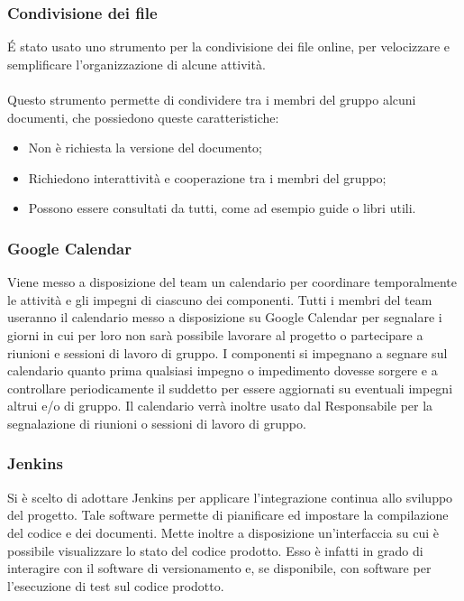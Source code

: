 \subsubsection{Condivisione dei file}
\'E stato usato uno strumento per la condivisione dei file online, per velocizzare e semplificare l'organizzazione di alcune attività.

\paragraph{}
Questo strumento permette di condividere tra i membri del gruppo alcuni documenti, che possiedono queste caratteristiche:
\begin{itemize}
\item Non è richiesta la versione del documento;
\item Richiedono interattività e cooperazione tra i membri del gruppo;
\item Possono essere consultati da tutti, come ad esempio guide o libri utili.
\end{itemize}

\subsubsection{Google Calendar}
\label{4.2}
Viene messo a disposizione del team un calendario per coordinare temporalmente le attività e gli impegni di ciascuno dei componenti.
Tutti i membri del team useranno il calendario messo a disposizione su Google Calendar per segnalare i giorni in cui per loro non sarà possibile lavorare al progetto o partecipare a riunioni e sessioni di lavoro di gruppo. I componenti si impegnano a segnare sul calendario quanto prima qualsiasi impegno o impedimento dovesse sorgere e a controllare periodicamente il suddetto per essere aggiornati su eventuali impegni altrui e/o di gruppo.
Il calendario verrà inoltre usato dal Responsabile per la segnalazione di riunioni o sessioni di lavoro di gruppo.

\subsubsection{Jenkins}
\label{}
Si è scelto di adottare Jenkins per applicare l’integrazione continua allo sviluppo del progetto.
Tale software permette di pianificare ed impostare la compilazione del codice e dei documenti. 
Mette inoltre a disposizione un'interfaccia su cui è possibile visualizzare lo stato del codice prodotto. 
Esso è infatti in grado di interagire con il software di versionamento e, se disponibile, con software per l’esecuzione di test sul codice prodotto.


